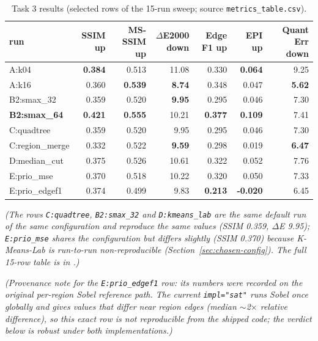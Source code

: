 \documentclass[11pt,a4paper]{article}
\begin{document}
\begin{table}[htbp]
\centering
\footnotesize
\setlength{\tabcolsep}{4pt}
\begin{tabular}{@{}l r r r r r r@{}}
\toprule
\textbf{run} & \textbf{SSIM up} & \textbf{MS-SSIM up} & \textbf{$\Delta$E2000 down} & \textbf{Edge F1 up} & \textbf{EPI up} & \textbf{Quant Err down}\\
\midrule
A:k04                  & \textbf{0.384} & 0.513 & 11.08 & 0.330 & \textbf{0.064} & 9.25 \\
A:k16                  & 0.360 & \textbf{0.539} & \textbf{8.74} & 0.348 & 0.047 & \textbf{5.62} \\
B2:smax\_32            & 0.359 & 0.520 & \textbf{9.95} & 0.295 & 0.046 & 7.30 \\
\textbf{B2:smax\_64}   & \textbf{0.421} & \textbf{0.555} & 10.21 & \textbf{0.377} & \textbf{0.109} & 7.41 \\
C:quadtree             & 0.359 & 0.520 & 9.95 & 0.295 & 0.046 & 7.30 \\
C:region\_merge        & 0.332 & 0.522 & \textbf{9.59} & 0.298 & 0.019 & \textbf{6.47} \\
D:median\_cut          & 0.375 & 0.526 & 10.61 & 0.322 & 0.052 & 7.76 \\
E:prio\_mse            & 0.370 & 0.518 & 10.22 & 0.320 & 0.050 & 7.33 \\
E:prio\_edgef1         & 0.374 & 0.499 & 9.83 & \textbf{0.213} & \textbf{-0.020} & 6.45 \\
\bottomrule
\end{tabular}
\caption{Task 3 results (selected rows of the 15-run sweep; source
\texttt{metrics\_table.csv}).}
\label{tab:t3}
\end{table}

\emph{(The rows \texttt{C:quadtree}, \texttt{B2:smax\_32} and
\texttt{D:kmeans\_lab} are the same default run of the same configuration and
reproduce the same values (SSIM 0.359, $\Delta$E 9.95); \texttt{E:prio\_mse}
shares the configuration but differs slightly (SSIM 0.370) because K-Means-Lab
is run-to-run non-reproducible (Section~\ref{sec:chosen-config}). The full
15-row table is in .)}

\emph{(Provenance note for the \texttt{E:prio\_edgef1} row: its numbers were
recorded on the original per-region Sobel reference path. The current
\texttt{impl="sat"} runs Sobel once globally and gives values that differ near
region edges (median $\sim$2$\times$ relative difference), so this exact row is
not reproducible from the shipped code; the verdict below is robust under both
implementations.)}
\end{document}
